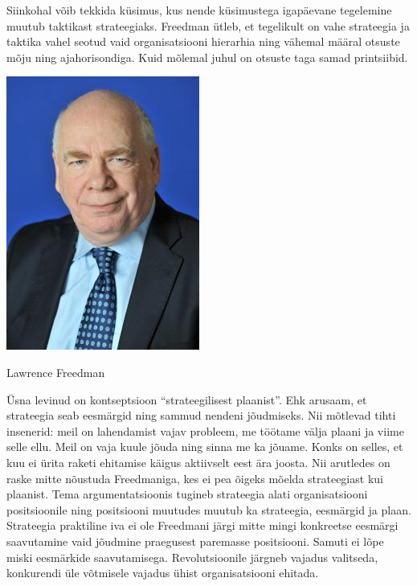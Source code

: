 Siinkohal võib tekkida küsimus, kus nende küsimustega igapäevane tegelemine muutub taktikast strateegiaks. Freedman ütleb, et tegelikult on vahe strateegia ja taktika vahel seotud vaid organisatsiooni hierarhia ning vähemal määral otsuste mõju ning ajahorisondiga. Kuid mõlemal juhul on otsuste taga samad printsiibid. 
\begin{marginfigure}
	\begin{center}
		\includegraphics[width=.84\linewidth]{freedman.jpg}
		\caption{Lawrence Freedman}
		\label{fig:freedman}
	\end{center}
\end{marginfigure}

Üsna levinud on kontseptsioon \enquote{strateegilisest plaanist}. Ehk arusaam, et strateegia seab eesmärgid ning sammud nendeni jõudmiseks. Nii mõtlevad tihti insenerid: meil on lahendamist vajav probleem, me töötame välja plaani ja viime selle ellu. Meil on vaja kuule jõuda ning sinna me ka jõuame. Konks on selles, et kuu ei ürita raketi ehitamise käigus aktiivselt eest ära joosta. Nii arutledes on raske mitte nõustuda Freedmaniga, kes ei pea õigeks mõelda strateegiast kui plaanist. Tema argumentatsioonis tugineb strateegia alati organisatsiooni positsioonile ning positsiooni muutudes muutub ka strateegia, eesmärgid ja plaan. Strateegia praktiline iva ei ole Freedmani järgi mitte mingi konkreetse eesmärgi saavutamine vaid jõudmine praegusest paremasse positsiooni. Samuti ei lõpe miski eesmärkide saavutamisega. Revolutsioonile järgneb vajadus valitseda, konkurendi üle võtmisele vajadus ühist organisatsiooni ehitada. 


